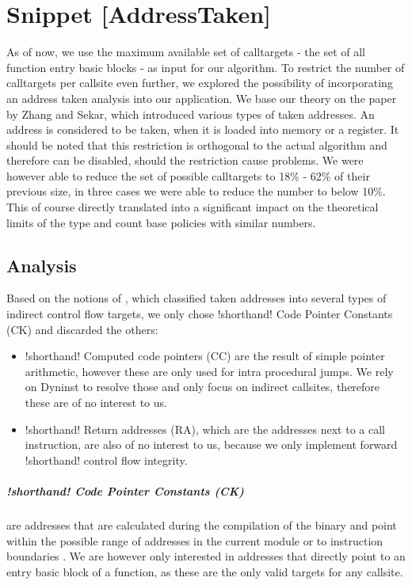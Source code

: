 \chapter{Snippet [AddressTaken]}

As of now, we use the maximum available set of calltargets - the set of all function entry basic blocks - as input for our algorithm. To restrict the number of calltargets per callsite even further, we explored the possibility of incorporating an address taken analysis into our application. We base our theory on the paper by Zhang and Sekar\cite{ZhangSekar00}, which introduced various types of taken addresses. An address is considered to be taken, when it is loaded into memory or a register. It should be noted that this restriction is orthogonal to the actual algorithm and therefore can be disabled, should the restriction cause problems. We were however able to reduce the set of possible calltargets to 18\% - 62\% of their previous size, in three cases we were able to reduce the number to below 10\%. This of course directly translated into a significant impact on the theoretical limits of the type and count base policies with similar numbers.


\section{Analysis}
Based on the notions of \cite{ZhangSekar00}, which classified taken addresses into several types of indirect control flow targets, we only chose {!shorthand! Code Pointer Constants (CK)} and discarded the others:
\begin{itemize}
\item {!shorthand! Computed code pointers (CC)} are the result of simple pointer arithmetic, however these are only used for intra procedural jumps\cite{ZhangSekar00}. We rely on Dyninst to resolve those and only focus on indirect callsites, therefore these are of no interest to us.
\item {!shorthand! Return addresses (RA)}, which are the addresses next to a call instruction, are also of no interest to us, because we only implement forward {!shorthand! control flow integrity}.
\end{itemize}


\paragraph{!shorthand! Code Pointer Constants (CK)} are addresses that are calculated during the compilation of the binary and point within the possible range of addresses in the current module or to instruction boundaries \cite{ZhangSekar00}. We are however only interested in addresses that directly point to an entry basic block of a function, as these are the only valid targets for any callsite.\\

